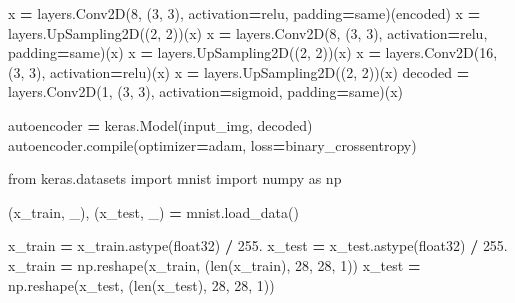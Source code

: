 \documentclass[
  a4paper,
  DIV=11,
  numbers=noendperiod]{scrreprt}
\newenvironment{Shaded}{\begin{snugshade}}{\end{snugshade}}
\newcommand{\BuiltInTok}[1]{#1}
\newcommand{\DecValTok}[1]{\textcolor[rgb]{0.00,0.00,0.81}{#1}}
\newcommand{\FloatTok}[1]{\textcolor[rgb]{0.00,0.00,0.81}{#1}}
\newcommand{\ImportTok}[1]{#1}
\newcommand{\NormalTok}[1]{#1}
\newcommand{\OperatorTok}[1]{\textcolor[rgb]{0.81,0.36,0.00}{\textbf{#1}}}
\newcommand{\StringTok}[1]{\textcolor[rgb]{0.31,0.60,0.02}{#1}}
\begin{document}
\begin{Shaded}
\begin{Highlighting}[numbers=left,,]
\NormalTok{x }\OperatorTok{=}\NormalTok{ layers.Conv2D(}\DecValTok{8}\NormalTok{, (}\DecValTok{3}\NormalTok{, }\DecValTok{3}\NormalTok{), activation}\OperatorTok{=}\StringTok{\textquotesingle{}relu\textquotesingle{}}\NormalTok{, padding}\OperatorTok{=}\StringTok{\textquotesingle{}same\textquotesingle{}}\NormalTok{)(encoded)}
\NormalTok{x }\OperatorTok{=}\NormalTok{ layers.UpSampling2D((}\DecValTok{2}\NormalTok{, }\DecValTok{2}\NormalTok{))(x)}
\NormalTok{x }\OperatorTok{=}\NormalTok{ layers.Conv2D(}\DecValTok{8}\NormalTok{, (}\DecValTok{3}\NormalTok{, }\DecValTok{3}\NormalTok{), activation}\OperatorTok{=}\StringTok{\textquotesingle{}relu\textquotesingle{}}\NormalTok{, padding}\OperatorTok{=}\StringTok{\textquotesingle{}same\textquotesingle{}}\NormalTok{)(x)}
\NormalTok{x }\OperatorTok{=}\NormalTok{ layers.UpSampling2D((}\DecValTok{2}\NormalTok{, }\DecValTok{2}\NormalTok{))(x)}
\NormalTok{x }\OperatorTok{=}\NormalTok{ layers.Conv2D(}\DecValTok{16}\NormalTok{, (}\DecValTok{3}\NormalTok{, }\DecValTok{3}\NormalTok{), activation}\OperatorTok{=}\StringTok{\textquotesingle{}relu\textquotesingle{}}\NormalTok{)(x)}
\NormalTok{x }\OperatorTok{=}\NormalTok{ layers.UpSampling2D((}\DecValTok{2}\NormalTok{, }\DecValTok{2}\NormalTok{))(x)}
\NormalTok{decoded }\OperatorTok{=}\NormalTok{ layers.Conv2D(}\DecValTok{1}\NormalTok{, (}\DecValTok{3}\NormalTok{, }\DecValTok{3}\NormalTok{), activation}\OperatorTok{=}\StringTok{\textquotesingle{}sigmoid\textquotesingle{}}\NormalTok{, padding}\OperatorTok{=}\StringTok{\textquotesingle{}same\textquotesingle{}}\NormalTok{)(x)}

\NormalTok{autoencoder }\OperatorTok{=}\NormalTok{ keras.Model(input\_img, decoded)}
\NormalTok{autoencoder.}\BuiltInTok{compile}\NormalTok{(optimizer}\OperatorTok{=}\StringTok{\textquotesingle{}adam\textquotesingle{}}\NormalTok{, loss}\OperatorTok{=}\StringTok{\textquotesingle{}binary\_crossentropy\textquotesingle{}}\NormalTok{)}

\ImportTok{from}\NormalTok{ keras.datasets }\ImportTok{import}\NormalTok{ mnist}
\ImportTok{import}\NormalTok{ numpy }\ImportTok{as}\NormalTok{ np}

\NormalTok{(x\_train, \_), (x\_test, \_) }\OperatorTok{=}\NormalTok{ mnist.load\_data()}

\NormalTok{x\_train }\OperatorTok{=}\NormalTok{ x\_train.astype(}\StringTok{\textquotesingle{}float32\textquotesingle{}}\NormalTok{) }\OperatorTok{/} \FloatTok{255.}
\NormalTok{x\_test }\OperatorTok{=}\NormalTok{ x\_test.astype(}\StringTok{\textquotesingle{}float32\textquotesingle{}}\NormalTok{) }\OperatorTok{/} \FloatTok{255.}
\NormalTok{x\_train }\OperatorTok{=}\NormalTok{ np.reshape(x\_train, (}\BuiltInTok{len}\NormalTok{(x\_train), }\DecValTok{28}\NormalTok{, }\DecValTok{28}\NormalTok{, }\DecValTok{1}\NormalTok{))}
\NormalTok{x\_test }\OperatorTok{=}\NormalTok{ np.reshape(x\_test, (}\BuiltInTok{len}\NormalTok{(x\_test), }\DecValTok{28}\NormalTok{, }\DecValTok{28}\NormalTok{, }\DecValTok{1}\NormalTok{))}



\end{Highlighting}
\end{Shaded}
\end{document}

